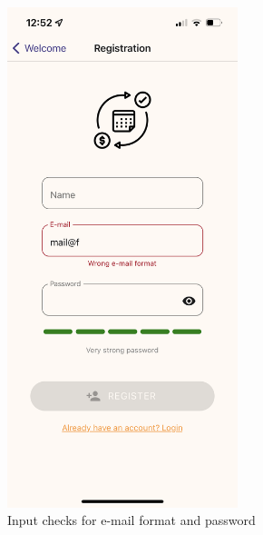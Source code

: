 \documentclass[12pt]{article}
\begin{document}
\begin{figure}[h!]
    \centering
    \begin{minipage}[c]{0.45\textwidth}
        \centering
        \includegraphics[width=0.6\textwidth, clip]{../../assets/smartphone/regFill.PNG}
        \caption{Input checks for e-mail format and password}
        \label{fig:rfill}
    \end{minipage}\hspace{1cm}%
    \begin{minipage}[c]{0.45\textwidth}
        \centering

\end{minipage}
\end{figure}
\end{document}
